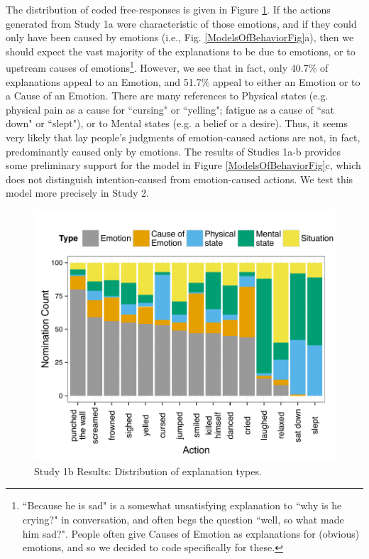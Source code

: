 \documentclass[10pt,letterpaper]{article}
\newcommand{\ndg}[1]{\textcolor{Green}{[ndg: #1]}}
\begin{document}

The distribution of coded free-responses is given in Figure \ref{Study1bResultsFig}. %
If the actions generated from Study 1a were characteristic of those emotions, and if they could only have been caused by emotions (i.e., Fig. \ref{ModelsOfBehaviorFig}a), then we should expect the vast majority of the explanations to be due to emotions, or to upstream causes of emotions\footnote{``Because he is sad" is a somewhat unsatisfying explanation to ``why is he crying?" in conversation, and often begs the question ``well, so what made him sad?". People often give Causes of Emotion as explanations for (obvious) emotions, and so we decided to code specifically for these.}. However, we see that in fact, only 40.7\% of explanations appeal to an Emotion, and 51.7\% appeal to either an Emotion or to a Cause of an Emotion. There are many references to Physical states (e.g. physical pain as a cause for ``cursing" or ``yelling"; fatigue as a cause of ``sat down" or ``slept"), or to Mental states (e.g. a belief or a desire). Thus, it seems very likely that lay people's judgments of emotion-caused actions are not, in fact, predominantly caused only by emotions. 
The results of Studies 1a-b provides some preliminary support for the model in Figure \ref{ModelsOfBehaviorFig}c, which does not distinguish intention-caused from emotion-caused actions. 
We test this model more precisely in Study 2.

\begin{figure}[htb!]
\begin{center}\includegraphics[width=1\columnwidth]{images/study1b_codePlot.pdf}\end{center}
\caption{ Study 1b Results: Distribution of explanation types. }
\label{Study1bResultsFig}
\end{figure}
\end{document}
